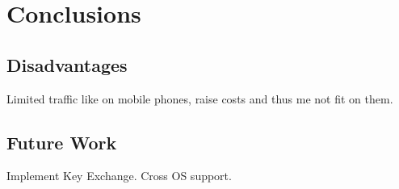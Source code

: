\section{Conclusions}
\subsection{Disadvantages}
Limited traffic like on mobile phones, raise costs and thus me not
fit on them.
\subsection{Future Work}
Implement Key Exchange.
Cross OS support.
